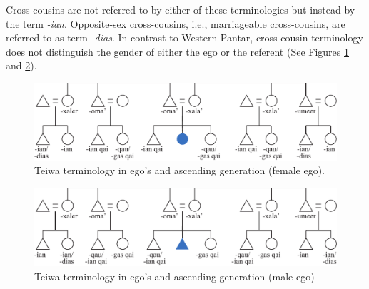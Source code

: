 Cross-cousins are not referred to by either of these terminologies but instead by the term \textit{-ian}. Opposite-sex cross-cousins, i.e., marriageable cross-cousins, are referred to as term \textit{-dias}. In contrast to Western Pantar, cross-cousin terminology does not distinguish the gender of either the ego or the referent (See Figures \ref{fig:5:5} and \ref{fig:5:6}).

\begin{figure}[h]
\includegraphics[width=\textwidth]{figures/Holton_ch5_fig5.pdf}
\caption{Teiwa terminology in ego's and ascending generation (female ego). }
\label{fig:5:5}
\end{figure}   

\begin{figure}[b]
\includegraphics[width=\textwidth]{figures/Holton_ch5_fig6.pdf}
\caption{Teiwa terminology in ego's and ascending generation (male ego) }
\label{fig:5:6}
\end{figure}  

 \clearpage

